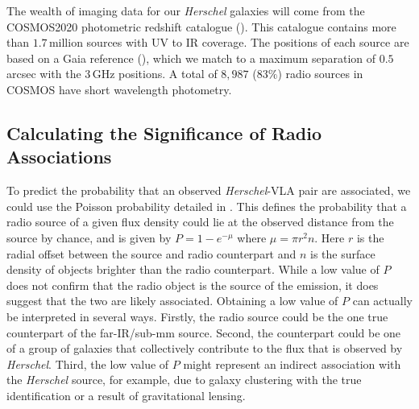The wealth of imaging data for our \textit{Herschel} galaxies will come from the COSMOS2020 photometric redshift catalogue (\citealt{Weaver_2022}). This catalogue contains more than $1.7\,$million sources with UV to IR coverage. The positions of each source are based on a Gaia reference (\citealt{Gaia_2016}), which we match to a maximum separation of $0.5\,$arcsec with the $3\,$GHz positions. A total of $8,987$ ($83\%$) radio sources in COSMOS have short wavelength photometry.

\subsection{Calculating the Significance of Radio Associations}
\label{sec:radio_significance}

To predict the probability that an observed \textit{Herschel}-VLA pair are associated, we could use the Poisson probability detailed in \citealt{Downes_1986}. This defines the probability that a radio source of a given flux density could lie at the observed distance from the source by chance, and is given by $P = 1-e^{-\mu}$ where $\mu = \pi r^2n$. Here $r$ is the radial offset between the source and radio counterpart and $n$ is the surface density of objects brighter than the radio counterpart. While a low value of $P$ does not confirm that the radio object is the source of the emission, it does suggest that the two are likely associated. Obtaining a low value of $P$ can actually be interpreted in several ways. Firstly, the radio source could be the one true counterpart of the far-IR/sub-mm source. Second, the counterpart could be one of a group of galaxies that collectively contribute to the flux that is observed by \textit{Herschel}. Third, the low value of $P$ might represent an indirect association with the \textit{Herschel} source, for example, due to galaxy clustering with the true identification or a result of gravitational lensing.

